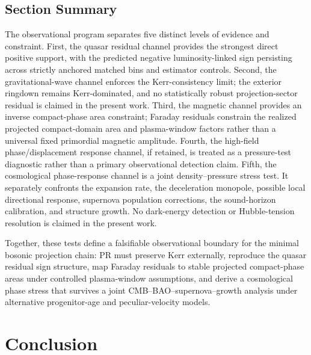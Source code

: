 \documentclass[11pt]{article}
\begin{document}
\subsection{Section Summary}
\label{sec:observational_summary}
The observational program separates five distinct levels of evidence and constraint. First, the quasar residual channel provides the strongest direct positive support, with the predicted negative luminosity-linked sign persisting across strictly anchored matched bins and estimator controls. Second, the gravitational-wave channel enforces the Kerr-consistency limit; the exterior ringdown remains Kerr-dominated, and no statistically robust projection-sector residual is claimed in the present work. Third, the magnetic channel provides an inverse compact-phase area constraint; Faraday residuals constrain the realized projected compact-domain area and plasma-window factors rather than a universal fixed primordial magnetic amplitude. Fourth, the high-field phase/displacement response channel, if retained, is treated as a pressure-test diagnostic rather than a primary observational detection claim. Fifth, the cosmological phase-response channel is a joint density--pressure stress test. It separately confronts the expansion rate, the deceleration monopole, possible local directional response, supernova population corrections, the sound-horizon calibration, and structure growth. No dark-energy detection or Hubble-tension resolution is claimed in the present work.

Together, these tests define a falsifiable observational boundary for the minimal bosonic projection chain: PR must preserve Kerr externally, reproduce the quasar residual sign structure, map Faraday residuals to stable projected compact-phase areas under controlled plasma-window assumptions, and derive a cosmological phase stress that survives a joint CMB--BAO--supernova--growth analysis under alternative progenitor-age and peculiar-velocity models.

\section{Conclusion}
\label{sec:conclusion}
\end{document}
